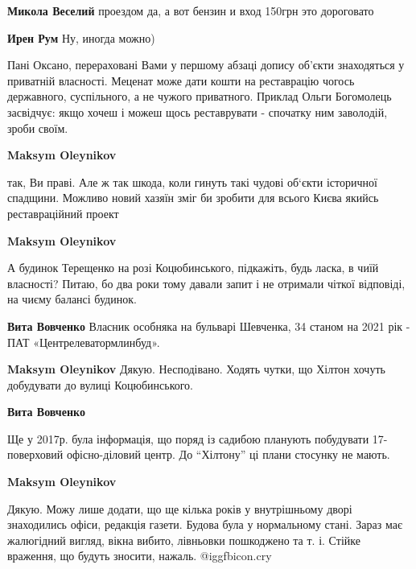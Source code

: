 \begin{itemize}
\begin{itemize} %
\textbf{Микола Веселий} проездом да, а вот бензин и вход 150грн это дороговато

\textbf{Ирен Рум} Ну, иногда можно)
\end{itemize} %


Пані Оксано, перераховані Вами у першому абзаці допису об'єкти знаходяться у
приватній власності. Меценат може дати кошти на реставрацію чогось державного,
суспільного, а не чужого приватного. Приклад Ольги Богомолець засвідчує: якщо
хочеш і можеш щось реставрувати - спочатку ним заволодій, зроби своїм.

\begin{itemize} %
\textbf{Maksym Oleynikov}

так, Ви праві. Але ж так шкода, коли гинуть такі чудові об‘єкти історичної
спадщини. Можливо новий хазяїн зміг би зробити для всього Києва якийсь
реставраційний проект

\textbf{Maksym Oleynikov} 

А будинок Терещенко на розі Коцюбинського, підкажіть, будь ласка, в чиїй
власності? Питаю, бо два роки тому давали запит і не отримали чіткої відповіді,
на чиєму балансі будинок.

\begin{itemize} %
\textbf{Вита Вовченко} Власник особняка на бульварі Шевченка, 34 станом на 2021 рік - ПАТ «Центрелеватормлинбуд».

\textbf{Maksym Oleynikov} Дякую. Несподівано. Ходять чутки, що Хілтон хочуть добудувати до вулиці Коцюбинського.

\textbf{Вита Вовченко} 

Ще у 2017р. була інформація, що поряд із садибою планують побудувати
17-поверховий офісно-діловий центр. До \enquote{Хілтону} ці плани стосунку не мають.


\textbf{Maksym Oleynikov} 

Дякую. Можу лише додати, що ще кілька років у внутрішньому дворі знаходились
офіси, редакція газети. Будова була у нормальному стані. Зараз має жалюгідний
вигляд, вікна вибито, лівньовки пошкоджено та т. і. Стійке враження, що будуть
зносити, нажаль. @igg{fbicon.cry} 

\end{itemize} %


\end{itemize}
\end{itemize}
